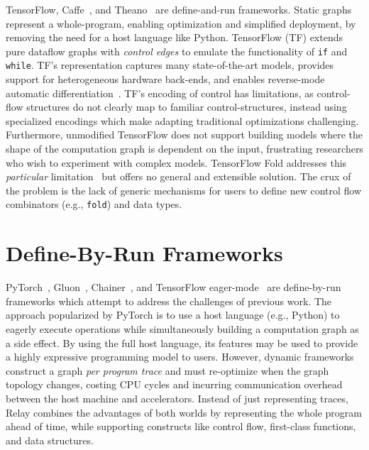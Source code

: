 TensorFlow, Caffe~\citep{caffe}, and Theano~\citep{theano} are define-and-run frameworks.
Static graphs represent a whole-program,
  enabling optimization and simplified deployment,
  by removing the need for a host language like Python.
TensorFlow (TF) extends pure dataflow graphs with \textit{control edges}
      to emulate the functionality of \verb|if| and \verb|while|.
TF's representation captures many state-of-the-art models,
      provides support for heterogeneous hardware back-ends,
      and enables reverse-mode automatic differentiation~{\citep{ad_survey, tensorflow}}.
TF's encoding of control has limitations, as control-flow structures
    do not clearly map to familiar control-structures, instead using specialized
    encodings which make adapting traditional optimizations challenging.
Furthermore,
    unmodified TensorFlow does not support building models where the shape of
    the computation graph is dependent on the input,
    frustrating researchers who wish to experiment with complex models.
TensorFlow Fold addresses this \textit{particular} limitation~\citep{tensorflowfold}
    but offers no general and extensible solution.
The crux of the problem is the lack of generic mechanisms for users to
    define new control flow combinators (e.g., \verb|fold|) and data types.

\section{Define-By-Run Frameworks}
PyTorch~\citep{pytorch_ad}, Gluon~\citep{gluon}, Chainer~\citep{chainer_learningsys2015},
    and TensorFlow eager-mode~\citep{tf_eager} are define-by-run frameworks which
    attempt to address the challenges of previous work.
The approach popularized by PyTorch is to use a host language (e.g., Python)
    to eagerly execute operations while simultaneously building a computation graph
    as a side effect.
By using the full host language,
  its features may be used to provide a highly expressive programming model to users.
However, dynamic frameworks construct a graph \textit{per program trace} and must re-optimize when
    the graph topology changes, costing CPU cycles and incurring communication overhead between the host
    machine and accelerators.
Instead of just representing traces, Relay combines the advantages of both worlds by
    representing the whole program ahead of time,
    while supporting constructs like control flow, first-class functions, and data structures.

